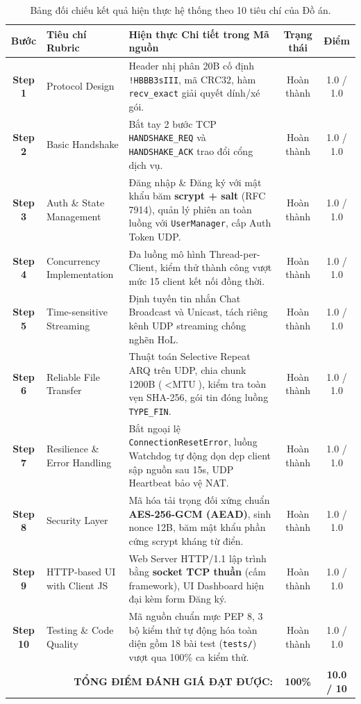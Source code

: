 \documentclass[11pt,a4paper]{article}
\begin{document}
\begin{table}[htbp]
\centering
\small
\begin{tabularx}{\textwidth}{cp{3.8cm}Xcc}
\toprule
\rowcolor{headergray}
\textbf{Bước} & \textbf{Tiêu chí Rubric} & \textbf{Hiện thực Chi tiết trong Mã nguồn} & \textbf{Trạng thái} & \textbf{Điểm} \\
\midrule
\textbf{Step 1} & Protocol Design & Header nhị phân 20B cố định \texttt{!HBBB3sIII}, mã CRC32, hàm \texttt{recv_exact} giải quyết dính/xé gói. & Hoàn thành & 1.0 / 1.0 \\
\textbf{Step 2} & Basic Handshake & Bắt tay 2 bước TCP \texttt{HANDSHAKE\_REQ} và \texttt{HANDSHAKE\_ACK} trao đổi cổng dịch vụ. & Hoàn thành & 1.0 / 1.0 \\
\textbf{Step 3} & Auth \& State Management & Đăng nhập \& Đăng ký với mật khẩu băm \textbf{scrypt + salt} (RFC 7914), quản lý phiên an toàn luồng với \texttt{UserManager}, cấp Auth Token UDP. & Hoàn thành & 1.0 / 1.0 \\
\textbf{Step 4} & Concurrency Implementation & Đa luồng mô hình Thread-per-Client, kiểm thử thành công vượt mức 15 client kết nối đồng thời. & Hoàn thành & 1.0 / 1.0 \\
\textbf{Step 5} & Time-sensitive Streaming & Định tuyến tin nhắn Chat Broadcast và Unicast, tách riêng kênh UDP streaming chống nghẽn HoL. & Hoàn thành & 1.0 / 1.0 \\
\textbf{Step 6} & Reliable File Transfer & Thuật toán Selective Repeat ARQ trên UDP, chia chunk 1200B ($< \text{MTU}$), kiểm tra toàn vẹn SHA-256, gói tin đóng luồng \texttt{TYPE\_FIN}. & Hoàn thành & 1.0 / 1.0 \\
\textbf{Step 7} & Resilience \& Error Handling & Bắt ngoại lệ \texttt{ConnectionResetError}, luồng Watchdog tự động dọn dẹp client sập nguồn sau 15s, UDP Heartbeat bảo vệ NAT. & Hoàn thành & 1.0 / 1.0 \\
\textbf{Step 8} & Security Layer & Mã hóa tải trọng đối xứng chuẩn \textbf{AES-256-GCM (AEAD)}, sinh nonce 12B, băm mật khẩu phần cứng scrypt kháng từ điển. & Hoàn thành & 1.0 / 1.0 \\
\textbf{Step 9} & HTTP-based UI with Client JS & Web Server HTTP/1.1 lập trình bằng \textbf{socket TCP thuần} (cấm framework), UI Dashboard hiện đại kèm form Đăng ký. & Hoàn thành & 1.0 / 1.0 \\
\textbf{Step 10} & Testing \& Code Quality & Mã nguồn chuẩn mực PEP 8, 3 bộ kiểm thử tự động hóa toàn diện gồm 18 bài test (\texttt{tests/}) vượt qua 100\% ca kiểm thử. & Hoàn thành & 1.0 / 1.0 \\
\midrule
\multicolumn{3}{r}{\textbf{TỔNG ĐIỂM ĐÁNH GIÁ ĐẠT ĐƯỢC:}} & \textbf{100\%} & \textbf{10.0 / 10} \\
\bottomrule
\end{tabularx}
\caption{Bảng đối chiếu kết quả hiện thực hệ thống theo 10 tiêu chí của Đồ án.}
\label{tab:rubric}
\end{table}
\end{document}
